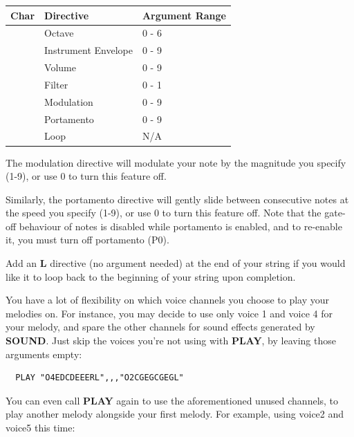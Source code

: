 \begin{description}[leftmargin=2cm,style=nextline]
\begin{center}
{\setlength{\tabcolsep}{1mm}
\begin{tabular}{*{1}{|R{9mm}}|l|l|}
\hline
{\bf Char}  & {\bf Directive} & {\bf Argument Range} \\
\hline
{} & Octave              & 0 - 6 \\
 & Instrument Envelope & 0 - 9 \\
 & Volume              & 0 - 9 \\
 & Filter              & 0 - 1 \\
 & Modulation          & 0 - 9 \\
 & Portamento          & 0 - 9 \\
 & Loop                & N/A   \\
\hline
\end{tabular}
}
\end{center}

  The modulation directive will modulate your note by the magnitude you specify (1-9), or use 0 to turn this feature off.

    Similarly, the portamento directive will gently slide between consecutive notes at the speed you specify (1-9), or use 0 to turn this feature off. Note that the gate-off behaviour of notes is disabled while portamento is enabled, and to re-enable it, you must turn off portamento (P0).

    Add an {\bf L} directive (no argument needed) at the end of your string if you would like it to loop back to the
  beginning of your string upon completion.

  You have a lot of flexibility on which voice channels you choose to play your melodies on.
  For instance, you may decide to use only voice 1 and voice 4 for your melody, and spare
  the other channels for sound effects generated by {\bf SOUND}. Just skip the voices
  you're not using with {\bf PLAY}, by leaving those arguments empty:

\begin{tcolorbox}[colback=black,coltext=white]
\verbatimfont{\codefont}
\begin{verbatim}
  PLAY "O4EDCDEEERL",,,"O2CGEGCGEGL"
\end{verbatim}
\end{tcolorbox}

  You can even call {\bf PLAY} again to use the aforementioned unused channels, to play another melody
  alongside your first melody. For example, using voice2 and voice5 this time:


\end{description}
